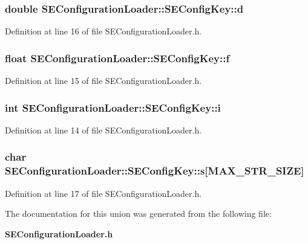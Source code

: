 \subsubsection[{d}]{\setlength{\rightskip}{0pt plus 5cm}double S\+E\+Configuration\+Loader\+::\+S\+E\+Config\+Key\+::d}\label{union_s_e_configuration_loader_1_1_s_e_config_key_a97f676d38b2e34e86d94462cb37ec687}


Definition at line 16 of file S\+E\+Configuration\+Loader.\+h.

\subsubsection[{f}]{\setlength{\rightskip}{0pt plus 5cm}float S\+E\+Configuration\+Loader\+::\+S\+E\+Config\+Key\+::f}\label{union_s_e_configuration_loader_1_1_s_e_config_key_a053571810a7bb341665fa3ca6c165008}


Definition at line 15 of file S\+E\+Configuration\+Loader.\+h.

\subsubsection[{i}]{\setlength{\rightskip}{0pt plus 5cm}int S\+E\+Configuration\+Loader\+::\+S\+E\+Config\+Key\+::i}\label{union_s_e_configuration_loader_1_1_s_e_config_key_a1c7dd35b903a2fb1c9141938ac780936}


Definition at line 14 of file S\+E\+Configuration\+Loader.\+h.

\subsubsection[{s}]{\setlength{\rightskip}{0pt plus 5cm}char S\+E\+Configuration\+Loader\+::\+S\+E\+Config\+Key\+::s[M\+A\+X\+\_\+\+S\+T\+R\+\_\+\+S\+I\+Z\+E]}\label{union_s_e_configuration_loader_1_1_s_e_config_key_a9d761a4cad424e7e8f6dde55dd44f2c4}


Definition at line 17 of file S\+E\+Configuration\+Loader.\+h.



The documentation for this union was generated from the following file\+:\begin{DoxyCompactItemize}
\item 
{\bf S\+E\+Configuration\+Loader.\+h}\end{DoxyCompactItemize}
